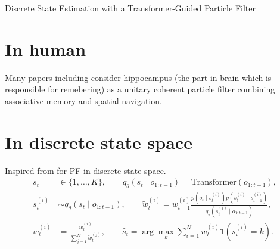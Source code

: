 \begin{frame}{Discrete State Estimation with a Transformer-Guided Particle Filter}
    \section{In human}
        Many papers including \cite{fox-2010-learning-in-a-unitary-coherent-hippocampus} consider hippocampus (the part in brain which is responsible for remebering) as a unitary coherent particle filter combining associative memory and spatial navigation.
        
        \section{In discrete state space}
        Inspired from \cite{chopin-2001-sequential-inference-and-state-number-determination-for-discrete-state-space-models-through-particle-filtering} for PF in discrete state space.
        \[
            \begin{aligned}
                s_t
                &\in
                \{1,\ldots,K\},
                \qquad
                q_{\theta}(s_t \mid o_{1:t-1})
                =
                \mathrm{Transformer}(o_{1:t-1}),
                \\[4pt]
                s_t^{(i)}
                &\sim
                q_{\theta}(s_t \mid o_{1:t-1}),
                \qquad
                \tilde{w}_t^{(i)}
                =
                w_{t-1}^{(i)}
                \frac{
                    p(o_t \mid s_t^{(i)})
                    p(s_t^{(i)} \mid s_{t-1}^{(i)})
                }{
                    q_{\theta}(s_t^{(i)} \mid o_{1:t-1})
                },
                \\[4pt]
                w_t^{(i)}
                &=
                \frac{
                    \tilde{w}_t^{(i)}
                }{
                    \sum_{j=1}^{N}\tilde{w}_t^{(j)}
                },
                \qquad
                \hat{s}_t
                =
                \arg\max_{k}
                \sum_{i=1}^{N}
                w_t^{(i)}
                \mathbf{1}
                \left(
                    s_t^{(i)}=k
                \right).
            \end{aligned}
        \]
        

\end{frame}
